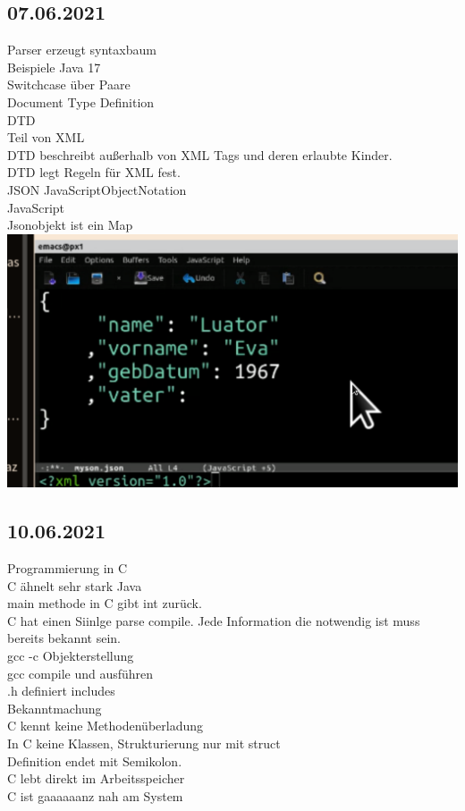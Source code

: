 \documentclass[paper=A4]{article}
\begin{document}
 	\subsection*{07.06.2021}
 	Parser erzeugt syntaxbaum \\
 	Beispiele Java 17  \\
 	Switchcase über Paare \\
 	Document Type Definition \\
 	DTD \\
 	Teil von XML \\
 	DTD beschreibt außerhalb von XML Tags und deren erlaubte Kinder. \\
 	DTD legt Regeln für XML fest. \\
 	JSON JavaScriptObjectNotation \\
 	JavaScript \\
 	Jsonobjekt ist ein Map \\
 	\includegraphics[width=\linewidth]{jsonsample} \\
 	\subsection*{10.06.2021}
 	Programmierung in C \\
 	C ähnelt sehr stark Java \\
 	main methode in C gibt int zurück. \\
 	C hat einen Siinlge parse compile.
 	Jede Information die notwendig ist muss bereits bekannt sein. \\
 	gcc -c Objekterstellung  \\
 	gcc compile und ausführen \\
 	.h definiert includes \\
 	Bekanntmachung \\
 	C kennt keine Methodenüberladung\\
 	In C keine Klassen, Strukturierung nur mit struct \\
 	Definition endet mit Semikolon.   \\
 	C lebt direkt im Arbeitsspeicher \\
 	C ist gaaaaaanz nah am System \\
\end{document}
